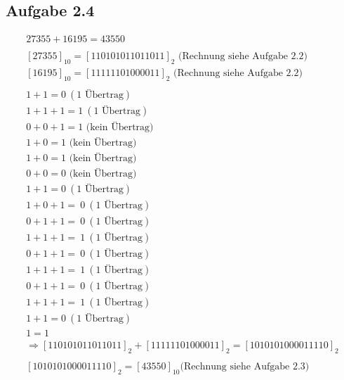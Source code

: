 \documentclass[12pt,a4paper]{article}
\begin{document}
\subsection*{Aufgabe 2.4}
\begin{align*}
27355 + 16195 = 43550 \\
\\
[27355]_{10} = [110101011011011]_{2} \textrm{ (Rechnung siehe Aufgabe 2.2)} \\
[16195]_{10} = [11111101000011]_{2} \textrm{ (Rechnung siehe Aufgabe 2.2)} \\
\\
1 + 1 = 0 ~(1 \textrm{ Übertrag}) \\
1 + 1 + 1 = 1 ~(1 \textrm{ Übertrag}) \\
0 + 0 + 1 = 1 \textrm{ (kein Übertrag) } \\
1 + 0 = 1 \textrm{ (kein Übertrag) } \\
1 + 0 = 1 \textrm{ (kein Übertrag) } \\
0 + 0 = 0 \textrm{ (kein Übertrag) } \\
1 + 1 = 0 ~(1 \textrm{ Übertrag}) \\
1 + 0 + 1 = ~0 ~(1 \textrm{ Übertrag}) \\
0 + 1 + 1 = ~0 ~ (1 \textrm{ Übertrag}) \\
1 + 1 + 1 = ~1 ~(1 \textrm{ Übertrag}) \\
0 + 1 + 1 = ~0~ (1 \textrm{ Übertrag}) \\
1 + 1 + 1 = ~1~ (1 \textrm{ Übertrag}) \\
0 + 1 + 1 = ~0~ (1 \textrm{ Übertrag}) \\
1 + 1 + 1 = ~1~ (1 \textrm{ Übertrag}) \\
1 + 1 = 0 ~(1 \textrm{ Übertrag}) \\
1 = 1 \\
\Rightarrow [110101011011011]_{2} + [11111101000011]_{2} = [1010101000011110]_{2} \\
\\
[1010101000011110]_{2} = [43550]_{10} \textrm{(Rechnung siehe Aufgabe 2.3)}
\end{align*}
\end{document}
